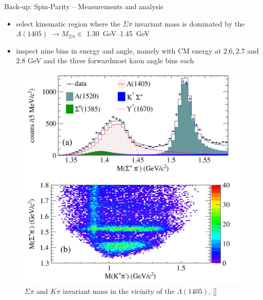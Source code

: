 \documentclass[11pt,aspectratio=1610,dvipsnames]{beamer}
\begin{document}
\begin{frame}{Back-up: Spin-Parity -- Measurements and analysis}
	\begin{minipage}{.4\linewidth}
		\begin{tcolorbox}[colback=black!10,colframe=gray!20!black,title=Event selection] 
			\begin{itemize}
				\item select kinematic region where the $\Sigma\pi$ invariant mass is dominated by the $\Lambda(1405)$ $\to M_{\Sigma\pi}\in$ \SIrange{1.30}{1.45}{\giga\eV}
				\item inspect nine bins in energy and angle, namely with CM energy at $2.6, 2.7$ and $2.8$ GeV and the  three forwardmost kaon angle bins each
			\end{itemize}
		\end{tcolorbox}	
	\end{minipage}
	\begin{minipage}{.57\linewidth}
		\begin{figure}
			\centering
			\includegraphics[width=.95\linewidth]{events_pol}
			\caption*{$\Sigma\pi$  and $K\pi$ invariant mass in the vicinity of the $\Lambda(1405)$,  [\cite{spinparity}]}
		\end{figure}
	\end{minipage}
\end{frame}
\end{document}
